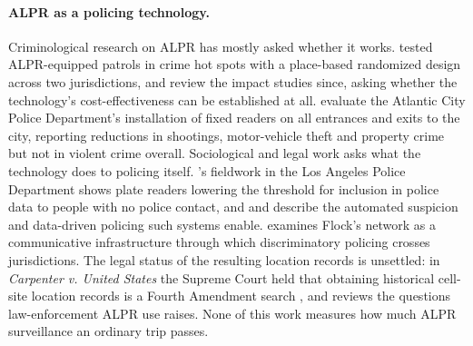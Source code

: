 \documentclass[11pt,twoside]{article}
\newcommand{\alpr}{ALPR\xspace}
\begin{document}
\paragraph{\alpr as a policing technology.} Criminological research on \alpr has mostly asked
whether it works. \citet{lum2011} tested \alpr-equipped patrols in crime hot spots with a
place-based randomized design across two jurisdictions, and \citet{lum2025} review the impact
studies since, asking whether the technology's cost-effectiveness can be established at all.
\citet{shjarback2025} evaluate the Atlantic City Police Department's installation of fixed
readers on all entrances and exits to the city, reporting reductions in shootings, motor-vehicle
theft and property crime but not in violent crime overall. Sociological and legal work asks what
the technology does to policing itself. \citet{brayne2017}'s fieldwork in the Los Angeles Police
Department shows plate readers lowering the threshold for inclusion in police data to people with
no police contact, and \citet{joh2016} and \citet{ferguson2017} describe the automated suspicion
and data-driven policing such systems enable. \citet{monahan2026} examines Flock's network as a
communicative infrastructure through which discriminatory policing crosses jurisdictions. The
legal status of the resulting location records is unsettled: in \emph{Carpenter v. United States}
the Supreme Court held that obtaining historical cell-site location records is a Fourth Amendment
search \citep{carpenter2018}, and
\citet{finklea2024} reviews the questions law-enforcement \alpr use raises. None of this work
measures how much \alpr surveillance an ordinary trip passes.
\end{document}
